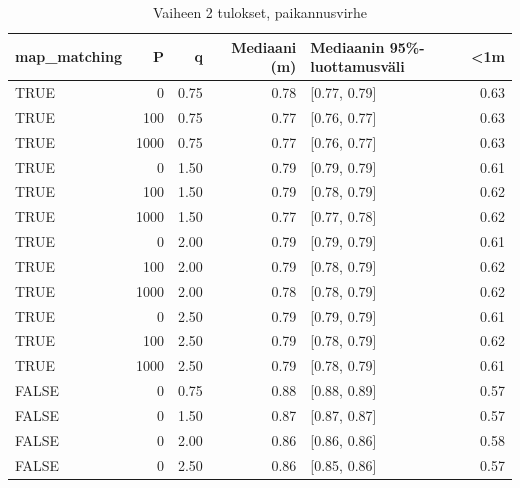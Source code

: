 \documentclass[
  12pt,
  a4paper, twoside]{book}
\begin{document}
\begin{table}

\caption{\label{tab:vaihe-2-tulokset}Vaiheen 2 tulokset, paikannusvirhe}
\centering
\begin{tabular}[t]{lrrrlr}
\toprule
map\_matching & P & q & Mediaani (m) & Mediaanin 95\%-luottamusväli & <1m\\
\midrule
TRUE & 0 & 0.75 & 0.78 & {}[0.77, 0.79] & 0.63\\
TRUE & 100 & 0.75 & 0.77 & {}[0.76, 0.77] & 0.63\\
TRUE & 1000 & 0.75 & 0.77 & {}[0.76, 0.77] & 0.63\\
TRUE & 0 & 1.50 & 0.79 & {}[0.79, 0.79] & 0.61\\
TRUE & 100 & 1.50 & 0.79 & {}[0.78, 0.79] & 0.62\\
\addlinespace
TRUE & 1000 & 1.50 & 0.77 & {}[0.77, 0.78] & 0.62\\
TRUE & 0 & 2.00 & 0.79 & {}[0.79, 0.79] & 0.61\\
TRUE & 100 & 2.00 & 0.79 & {}[0.78, 0.79] & 0.62\\
TRUE & 1000 & 2.00 & 0.78 & {}[0.78, 0.79] & 0.62\\
TRUE & 0 & 2.50 & 0.79 & {}[0.79, 0.79] & 0.61\\
\addlinespace
TRUE & 100 & 2.50 & 0.79 & {}[0.78, 0.79] & 0.62\\
TRUE & 1000 & 2.50 & 0.79 & {}[0.78, 0.79] & 0.61\\
FALSE & 0 & 0.75 & 0.88 & {}[0.88, 0.89] & 0.57\\
FALSE & 0 & 1.50 & 0.87 & {}[0.87, 0.87] & 0.57\\
FALSE & 0 & 2.00 & 0.86 & {}[0.86, 0.86] & 0.58\\
\addlinespace
FALSE & 0 & 2.50 & 0.86 & {}[0.85, 0.86] & 0.57\\
\bottomrule
\end{tabular}
\end{table}
\end{document}
